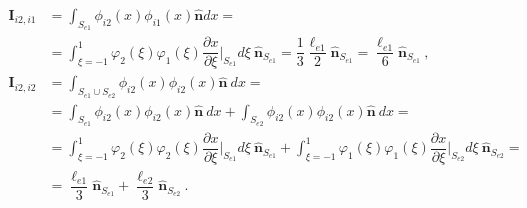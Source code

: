 \begin{equation}
\begin{aligned}
 \bm{I}_{i2,i1} & 
 = \int_{S_{e1}} \phi_{i2}(x)\phi_{i1}(x)\bm{\hat{n}} dx = \\ 
 & = \int_{\xi=-1}^{1}\varphi_2(\xi) \varphi_1(\xi)  \dfrac{\partial x}{\partial \xi}\bigg|_{S_{e1}}  d\xi \ \bm{\hat{n}}_{S_{e1}} = \dfrac{1}{3}\dfrac{\ell_{e1}}{2} \bm{\hat{n}}_{S_{e1}} = \dfrac{\ell_{e1}}{6} \bm{\hat{n}}_{S_{e1}}  \ , \\
 \bm{I}_{i2,i2} & = \int_{S_{e1}\cup S_{e2}} \phi_{i2}(x)\phi_{i2}(x)\bm{\hat{n}} \ dx = \\ 
 & = \int_{S_{e1}} \phi_{i2}(x)\phi_{i2}(x)\bm{\hat{n}} \ dx +    
     \int_{S_{e2}} \phi_{i2}(x)\phi_{i2}(x)\bm{\hat{n}} \ dx = \\ 
 & = \int_{\xi=-1}^{1}\varphi_2(\xi) \varphi_2(\xi)  \dfrac{\partial x}{\partial \xi}\bigg|_{S_{e1}}  d\xi \ \bm{\hat{n}}_{S_{e1}} + 
     \int_{\xi=-1}^{1}\varphi_1(\xi) \varphi_1(\xi)  \dfrac{\partial x}{\partial \xi}\bigg|_{S_{e2}}  d\xi \ \bm{\hat{n}}_{S_{e2}} = \\ 
 & = \dfrac{\ell_{e1}}{3} \bm{\hat{n}}_{S_{e1}} + \dfrac{\ell_{e2}}{3} \bm{\hat{n}}_{S_{e2}} \ . \\
\end{aligned}
\end{equation}


% 





